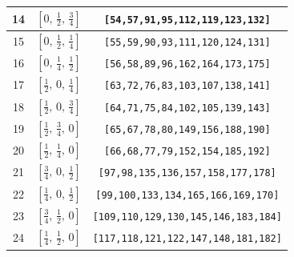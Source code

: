 \documentclass[fleqn,8pt]{jsarticle}
\begin{document}
\begin{longtable}{ccc}
14 & $\left[ 0,\, \frac{1}{2},\, \frac{3}{4} \right]$ & {\tt [54,57,91,95,112,119,123,132]} \\ \hline
15 & $\left[ 0,\, \frac{1}{2},\, \frac{1}{4} \right]$ & {\tt [55,59,90,93,111,120,124,131]} \\ \hline
16 & $\left[ 0,\, \frac{1}{4},\, \frac{1}{2} \right]$ & {\tt [56,58,89,96,162,164,173,175]} \\ \hline
17 & $\left[ \frac{1}{2},\, 0,\, \frac{1}{4} \right]$ & {\tt [63,72,76,83,103,107,138,141]} \\ \hline
18 & $\left[ \frac{1}{2},\, 0,\, \frac{3}{4} \right]$ & {\tt [64,71,75,84,102,105,139,143]} \\ \hline
19 & $\left[ \frac{1}{2},\, \frac{3}{4},\, 0 \right]$ & {\tt [65,67,78,80,149,156,188,190]} \\ \hline
20 & $\left[ \frac{1}{2},\, \frac{1}{4},\, 0 \right]$ & {\tt [66,68,77,79,152,154,185,192]} \\ \hline
21 & $\left[ \frac{3}{4},\, 0,\, \frac{1}{2} \right]$ & {\tt [97,98,135,136,157,158,177,178]} \\ \hline
22 & $\left[ \frac{1}{4},\, 0,\, \frac{1}{2} \right]$ & {\tt [99,100,133,134,165,166,169,170]} \\ \hline
23 & $\left[ \frac{3}{4},\, \frac{1}{2},\, 0 \right]$ & {\tt [109,110,129,130,145,146,183,184]} \\ \hline
24 & $\left[ \frac{1}{4},\, \frac{1}{2},\, 0 \right]$ & {\tt [117,118,121,122,147,148,181,182]} \\
\end{longtable}
\renewcommand{\arraystretch}{1.2}
\end{document}
